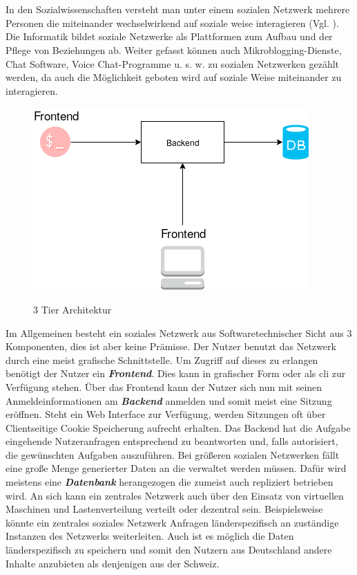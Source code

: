 \section{
}
	In den Sozialwissenschaften versteht man unter einem sozialen Netzwerk mehrere Personen die miteinander wechselwirkend auf soziale weise interagieren (Vgl. \cite{wikipedia-social-network-sociology}). Die Informatik bildet soziale Netzwerke als Plattformen zum Aufbau und der Pflege von Beziehungen ab. Weiter gefasst können auch Mikroblogging-Dienste, Chat Software, Voice Chat-Programme u. s. w. zu sozialen Netzwerken gezählt werden, da auch die Möglichkeit geboten wird auf soziale Weise miteinander zu interagieren.
	\begin{figure}[h]
		\begin{minipage}{\textwidth}
			\centering
			\includegraphics[scale=0.55]{figures/central-social-network.png}
			\label{fig:central-social-network}
			\caption{3 Tier Architektur}
		\end{minipage}
	\end{figure}
	Im Allgemeinen besteht ein soziales Netzwerk aus Softwaretechnischer Sicht aus 3 Komponenten, dies ist aber keine Prämisse. Der Nutzer benutzt das Netzwerk durch eine meist grafische Schnittstelle. Um Zugriff auf dieses zu erlangen benötigt der Nutzer ein \textit{\textbf{Frontend}}. Dies kann in grafischer Form oder als \gls{cli} zur Verfügung stehen. Über das Frontend kann der Nutzer sich nun mit seinen Anmeldeinformationen am \textit{\textbf{Backend}} anmelden und somit meist eine Sitzung eröffnen. Steht ein Web Interface zur Verfügung, werden Sitzungen oft über Clientseitige Cookie Speicherung aufrecht erhalten. Das Backend hat die Aufgabe eingehende Nutzeranfragen entsprechend zu beantworten und, falls autorisiert, die gewünschten Aufgaben auszuführen. Bei größeren sozialen Netzwerken fällt eine große Menge generierter Daten an die verwaltet werden müssen. Dafür wird meistens eine \textit{\textbf{Datenbank}} herangezogen die zumeist auch repliziert betrieben wird. An sich kann ein zentrales Netzwerk auch über den Einsatz von virtuellen Maschinen und Lastenverteilung verteilt oder dezentral sein. Beispielsweise könnte ein zentrales soziales Netzwerk Anfragen länderspezifisch an zuständige Instanzen des Netzwerks weiterleiten. Auch ist es möglich die Daten länderspezifisch zu speichern und somit den Nutzern aus Deutschland andere Inhalte anzubieten als denjenigen aus der Schweiz.\\
	
